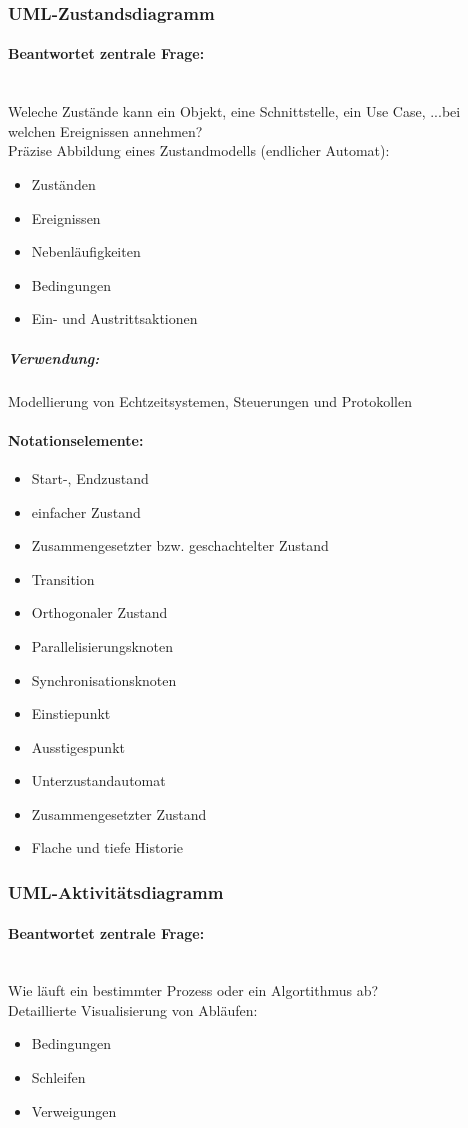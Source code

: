 \documentclass[../ZF_SWEN1.tex]{subfiles}
\begin{document}
\subsubsection{UML-Zustandsdiagramm}
\paragraph{Beantwortet zentrale Frage:}\\
Weleche Zustände kann ein Objekt, eine Schnittstelle, ein Use Case, ...bei welchen Ereignissen annehmen?\\
Präzise Abbildung eines Zustandmodells (endlicher Automat):
\begin{itemize}
	\item Zuständen
	\item Ereignissen
	\item Nebenläufigkeiten
	\item Bedingungen
	\item Ein- und Austrittsaktionen
\end{itemize}
\subparagraph{Verwendung:} Modellierung von Echtzeitsystemen, Steuerungen und Protokollen 

\paragraph{Notationselemente:}
\begin{itemize}
	\item Start-, Endzustand
	\item einfacher Zustand
	\item Zusammengesetzter bzw. geschachtelter Zustand
	\item Transition
	\item Orthogonaler Zustand
	\item Parallelisierungsknoten
	\item Synchronisationsknoten
	\item Einstiepunkt
	\item Ausstigespunkt
	\item Unterzustandautomat
	\item Zusammengesetzter Zustand
	\item Flache und tiefe Historie
\end{itemize}


\subsubsection{UML-Aktivitätsdiagramm}
\paragraph{Beantwortet zentrale Frage:}\\
Wie läuft ein bestimmter Prozess oder ein Algortithmus ab?\\
Detaillierte Visualisierung von Abläufen:
\begin{itemize}
	\item Bedingungen
	\item Schleifen
	\item Verweigungen
\end{itemize}
\end{document}
